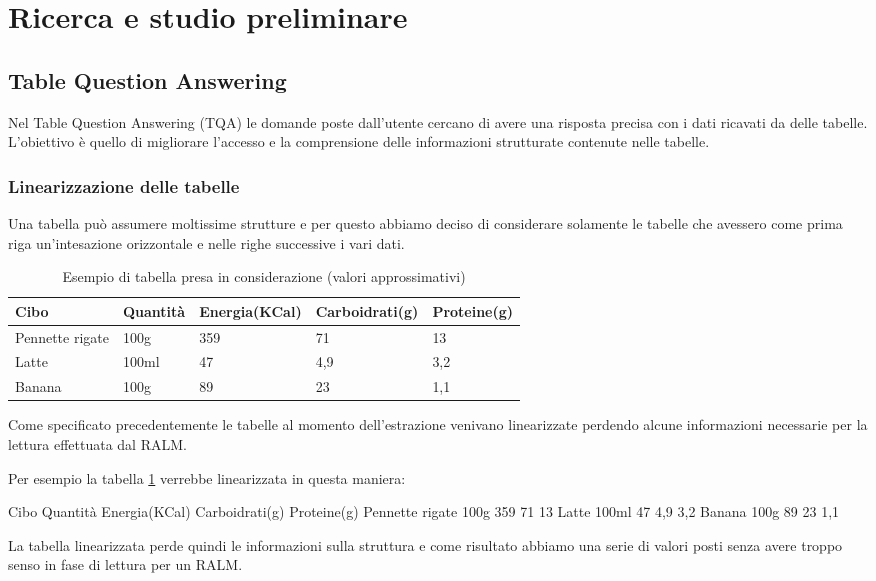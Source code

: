 \section{Ricerca e studio preliminare}
\subsection{Table Question Answering}
Nel Table Question Answering (TQA) le domande poste dall'utente cercano di avere una risposta precisa con i dati ricavati da delle tabelle.
L'obiettivo è quello di migliorare l'accesso e la comprensione delle informazioni strutturate contenute nelle tabelle.

\subsubsection{Linearizzazione delle tabelle}
Una tabella può assumere moltissime strutture e per questo abbiamo deciso di considerare solamente le tabelle che avessero come prima riga 
un'intesazione orizzontale e nelle righe successive i vari dati.

\begin{table}[H]
    \centering
    \begin{tabular}{|p{3cm} |p{2cm} |p{2cm}| p{2cm}| p{2cm}|}
        \hline
        Cibo & Quantità & Energia(KCal) & Carboidrati(g) & Proteine(g) \\
        \hline
        Pennette rigate & 100g & 359 & 71 & 13 \\
        \hline
        Latte & 100ml & 47 & 4,9 & 3,2 \\
        \hline
        Banana & 100g & 89 & 23 & 1,1 \\
        \hline
    \end{tabular}
    \caption{Esempio di tabella presa in considerazione (valori approssimativi)}
    \label{tab:esempio-cibo}
\end{table}
\noindent Come specificato precedentemente le tabelle al momento dell'estrazione venivano linearizzate 
perdendo alcune informazioni necessarie per la lettura effettuata dal RALM. 

\noindent Per esempio la tabella \ref{tab:esempio-cibo} verrebbe linearizzata in questa maniera:
\begin{tcolorbox}[colback=white, colframe=black]
    Cibo Quantità Energia(KCal) Carboidrati(g) Proteine(g) Pennette rigate  100g  359  71  13 Latte 100ml 47 4,9 3,2 Banana  100g 89 23 1,1
\end{tcolorbox}
\noindent La tabella linearizzata perde quindi le informazioni sulla struttura e come risultato abbiamo una serie di valori posti senza avere troppo senso in fase di lettura per un RALM. \\

